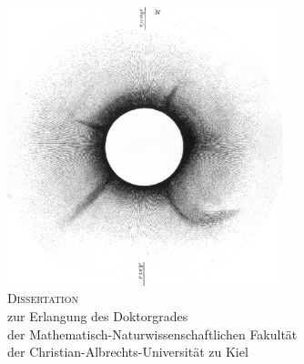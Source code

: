 \begin{titlepage}
\setlength{\hoffset}{0mm}
	\begin{addmargin}[-1cm]{-3cm}
    \begin{center}
        \large  

        \hfill

        \vfill

        \begingroup
            \hrulefill\\
            \vspace{.6cm}
            {\LARGE\myTitle} \\[0.3cm] 
	    	{\Large\mySubtitle} \\ 
        	\vspace{.1cm}
            \hrulefill\\
        \endgroup
	\vspace{1.5cm}
    \includegraphics[width=8cm]{images/oldcme3_inverted.png} \\
	\vspace{1.2cm}
    {\Large\textsc{Dissertation}}\\
	\vspace{.6cm}
        \begingroup
	    zur Erlangung des Doktorgrades\\
	    der Mathematisch-Naturwissenschaftlichen Fakult\"at\\
	    der Christian-Albrechts-Universit\"at zu Kiel
	\vspace{1.2cm}
        \endgroup     


\end{center}
\end{addmargin}
\end{titlepage}
